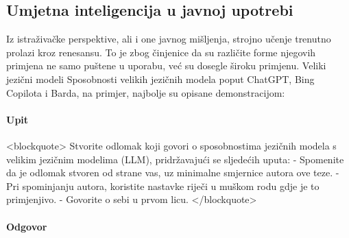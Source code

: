 \documentclass[diplomskirad]{fer}
\begin{document}
\subsection{Umjetna inteligencija u javnoj upotrebi}
Iz istraživačke perspektive, ali i one javnog mišljenja, strojno učenje trenutno prolazi kroz renesansu. To je zbog činjenice da su različite forme njegovih primjena ne samo puštene u uporabu, već su dosegle široku primjenu.
Veliki jezični modeli Sposobnosti velikih jezičnih modela poput ChatGPT, Bing Copilota i Barda, na primjer, najbolje su opisane demonstracijom:
\paragraph{Upit}
<blockquote>
Stvorite odlomak koji govori o sposobnostima jezičnih modela s velikim jezičnim modelima (LLM), pridržavajući se sljedećih uputa:
- Spomenite da je odlomak stvoren od strane vas, uz minimalne smjernice autora ove teze.
- Pri spominjanju autora, koristite nastavke riječi u muškom rodu gdje je to primjenjivo.
- Govorite o sebi u prvom licu.
</blockquote>
\paragraph{Odgovor}
\end{document}
